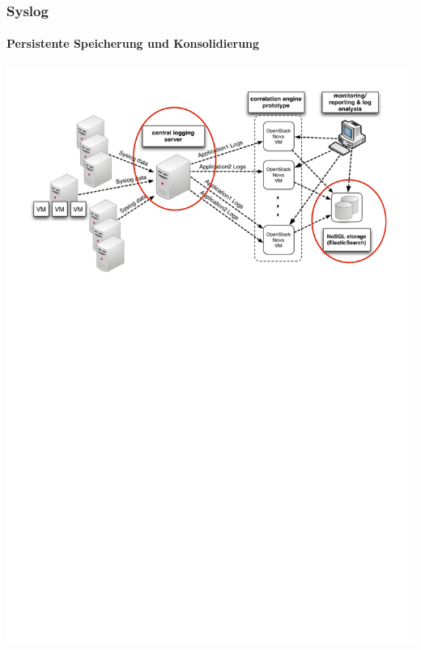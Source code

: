 \begin{frame}
\frametitle{Syslog}
\framesubtitle{Persistente Speicherung und Konsolidierung }
\includegraphics[scale=0.25]{img/schema-correlat-02.png}
\end{frame}



